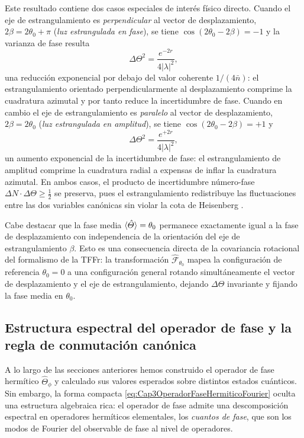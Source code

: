                 Este resultado contiene dos casos especiales de interés físico directo. Cuando el eje de estrangulamiento es \textit{perpendicular} al vector de desplazamiento, $2\beta = 2\theta_0+\pi$ (\textit{luz estrangulada en fase}), se tiene $\cos(2\theta_0-2\beta) = -1$ y la varianza de fase resulta
                \begin{equation}
                    \Delta\Theta^2 = \frac{e^{-2r}}{4|\lambda|^2},
                \end{equation}
                una reducción exponencial por debajo del valor coherente $1/(4\bar{n})$: el estrangulamiento orientado perpendicularmente al desplazamiento comprime la cuadratura azimutal y por tanto reduce la incertidumbre de fase. Cuando en cambio el eje de estrangulamiento es \textit{paralelo} al vector de desplazamiento, $2\beta = 2\theta_0$ (\textit{luz estrangulada en amplitud}), se tiene $\cos(2\theta_0-2\beta) = +1$ y
                \begin{equation}
                    \Delta\Theta^2 = \frac{e^{+2r}}{4|\lambda|^2},
                \end{equation}
                un aumento exponencial de la incertidumbre de fase: el estrangulamiento de amplitud comprime la cuadratura radial a expensas de inflar la cuadratura azimutal. En ambos casos, el producto de incertidumbre número-fase $\Delta N\cdot\Delta\Theta\geq\frac{1}{2}$ se preserva, pues el estrangulamiento redistribuye las fluctuaciones entre las dos variables canónicas sin violar la cota de Heisenberg \cite{stoler1970equivalence,yuen1976two,Walls2008}.

                Cabe destacar que la fase media $\braket{\hat{\Theta}} = \theta_0$ permanece exactamente igual a la fase de desplazamiento con independencia de la orientación del eje de estrangulamiento $\beta$. Esto es una consecuencia directa de la covariancia rotacional del formalismo de la TFFr: la transformación $\hat{\mathcal{F}}_{\theta_0}$ mapea la configuración de referencia $\theta_0=0$ a una configuración general rotando simultáneamente el vector de desplazamiento y el eje de estrangulamiento, dejando $\Delta\Theta$ invariante y fijando la fase media en $\theta_0$.

        \subsection{Estructura espectral del operador de fase y la regla de conmutación canónica}

            A lo largo de las secciones anteriores hemos construido el operador de fase hermítico $\hat{\Theta}_\phi$ y calculado sus valores esperados sobre distintos estados cuánticos. Sin embargo, la forma compacta \ref{eq:Cap3OperadorFaseHermiticoFourier} oculta una estructura algebraica rica: el operador de fase admite una descomposición espectral en operadores hermíticos elementales, los \textit{cuantos de fase}, que son los modos de Fourier del observable de fase al nivel de operadores.

